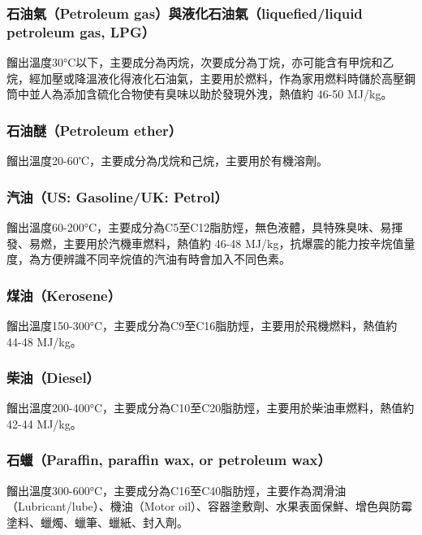 \documentclass[a4paper,12pt]{report}
\begin{document}
\begin{itemize}
\subsubsection{石油氣（Petroleum gas）與液化石油氣（liquefied/liquid petroleum gas, LPG）}
餾出溫度30°C以下，主要成分為丙烷，次要成分為丁烷，亦可能含有甲烷和乙烷，經加壓或降溫液化得液化石油氣，主要用於燃料，作為家用燃料時儲於高壓鋼筒中並人為添加含硫化合物使有臭味以助於發現外洩，熱值約 46-50 MJ/kg。
\subsubsection{石油醚（Petroleum ether）}
餾出溫度20-60℃，主要成分為戊烷和己烷，主要用於有機溶劑。
\subsubsection{汽油（US: Gasoline/UK: Petrol）}
餾出溫度60-200°C，主要成分為C5至C12脂肪烴，無色液體，具特殊臭味、易揮發、易燃，主要用於汽機車燃料，熱值約 46-48 MJ/kg，抗爆震的能力按辛烷值量度，為方便辨識不同辛烷值的汽油有時會加入不同色素。
\subsubsection{煤油（Kerosene）}
餾出溫度150-300°C，主要成分為C9至C16脂肪烴，主要用於飛機燃料，熱值約 44-48 MJ/kg。
\subsubsection{柴油（Diesel）}
餾出溫度200-400°C，主要成分為C10至C20脂肪烴，主要用於柴油車燃料，熱值約 42-44 MJ/kg。
\subsubsection{石蠟（Paraffin, paraffin wax, or petroleum wax）}
餾出溫度300-600°C，主要成分為C16至C40脂肪烴，主要作為潤滑油（Lubricant/lube）、機油（Motor oil）、容器塗敷劑、水果表面保鮮、增色與防霉塗料、蠟燭、蠟筆、蠟紙、封入劑。

\end{itemize}
\end{document}
